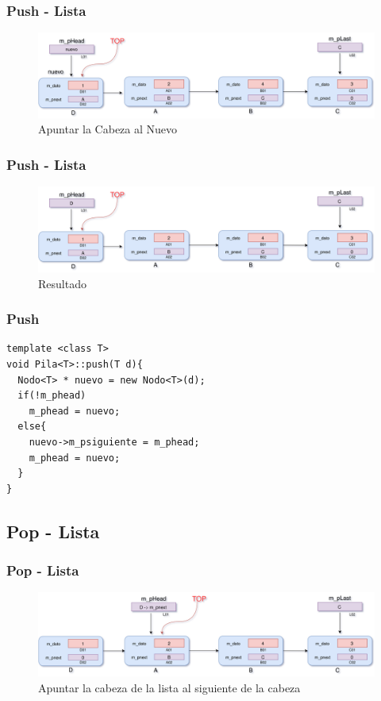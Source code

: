 \documentclass{beamer}
\begin{document}
\begin{frame}
    \frametitle{Push - Lista}
    
    \begin{figure}
    \includegraphics[width =1 \textwidth]{images/push03}
    \caption{Apuntar la Cabeza al Nuevo}
    \end{figure}
       
\end{frame}


\begin{frame}
    \frametitle{Push - Lista}
    
    \begin{figure}
    \includegraphics[width =1 \textwidth]{images/push04}
    \caption{Resultado}
    \end{figure}
       
\end{frame}


\begin{frame}[fragile]
\frametitle{Push}
\begin{verbatim}
template <class T>
void Pila<T>::push(T d){
  Nodo<T> * nuevo = new Nodo<T>(d);
  if(!m_phead)
    m_phead = nuevo;
  else{
    nuevo->m_psiguiente = m_phead;
    m_phead = nuevo;
  }
}
\end{verbatim}
\end{frame}  


\subsection{Pop - Lista}
\begin{frame}
    \frametitle{Pop - Lista}
    
    \begin{figure}
    \includegraphics[width =1 \textwidth]{images/pop02}
    \caption{Apuntar la cabeza de la lista al siguiente de la cabeza}
    \end{figure}
       
\end{frame}
\end{document}
